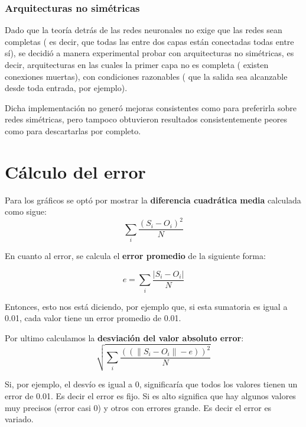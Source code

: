 \documentclass[%
    final,
    reprint,
    notitlepage,
    narroweqnarray,
    inline,
    twoside,
    invited
    ]{ieee}
\begin{document}
\subsubsection{Arquitecturas no simétricas}

\par Dado que la teoría detrás de las redes neuronales no exige que las redes sean completas ( es decir, que todas 
las entre dos capas están conectadas todas entre sí), se decidió a manera experimental probar con arquitecturas no simétricas, 
es decir, arquitecturas en las cuales la primer capa no es completa ( existen conexiones muertas), con condiciones razonables ( que la salida sea 
alcanzable desde toda entrada, por ejemplo).
\par Dicha implementación no generó mejoras consistentes como para preferirla sobre redes simétricas, pero tampoco 
obtuvieron resultados consistentemente peores como para descartarlas por completo.

\section{Cálculo del error}

\par Para los gráficos se optó por mostrar la \textbf{diferencia cuadrática media} calculada como sigue:\\

\begin{equation}
\sum\limits_{i}\frac{(S_i - O_i)^{2}}{N}
\end{equation}

\par En cuanto al error, se calcula el \textbf{error promedio} de la siguiente forma:

\begin{equation}
e = \sum\limits_{i}\frac{|S_i - O_i|}{N}
\end{equation}


Entonces, esto nos está diciendo, por ejemplo que, si esta sumatoria es igual a 0.01, cada valor tiene un error promedio de 0.01.

\par Por ultimo calculamos la \textbf{desviación del valor absoluto error}:\\

\begin{equation}
\sqrt{\sum\limits_{i}\frac{((\|S_i - O_i\| - e))^2}{N}}
\end{equation}

Si, por ejemplo, el desvío es igual a 0, significaría que todos los valores tienen un error de
0.01. Es decir el error es fijo. Si es alto significa que hay algunos valores muy precisos (error casi 0) y otros con errores grande. Es decir el error es variado.
\end{document}
